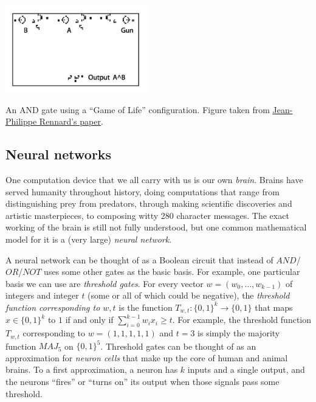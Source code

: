 \begin{marginfigure}
\centering
\includegraphics[width=\linewidth, height=1.5in, keepaspectratio]{../figure/game_of_life_and.png}
\caption{An AND gate using a ``Game of Life'' configuration. Figure
taken from
\href{http://www.rennard.org/alife/CollisionBasedRennard.pdf}{Jean-Philippe
Rennard's paper}.}
\label{gameoflifefig}
\end{marginfigure}

\subsection{Neural networks}\label{Neural-networks}

One computation device that we all carry with us is our own
\emph{brain}. Brains have served humanity throughout history, doing
computations that range from distinguishing prey from predators, through
making scientific discoveries and artistic masterpieces, to composing
witty 280 character messages. The exact working of the brain is still
not fully understood, but one common mathematical model for it is a
(very large) \emph{neural network}.

A neural network can be thought of as a Boolean circuit that instead of
\(\ensuremath{\mathit{AND}}\)/\(\ensuremath{\mathit{OR}}\)/\(\ensuremath{\mathit{NOT}}\)
uses some other gates as the basic basis. For example, one particular
basis we can use are \emph{threshold gates}. For every vector
\(w= (w_0,\ldots,w_{k-1})\) of integers and integer \(t\) (some or all
of which could be negative), the \emph{threshold function corresponding
to \(w,t\)} is the function \(T_{w,t}:\{0,1\}^k \rightarrow \{0,1\}\)
that maps \(x\in \{0,1\}^k\) to \(1\) if and only if
\(\sum_{i=0}^{k-1} w_i x_i \geq t\). For example, the threshold function
\(T_{w,t}\) corresponding to \(w=(1,1,1,1,1)\) and \(t=3\) is simply the
majority function \(\ensuremath{\mathit{MAJ}}_5\) on \(\{0,1\}^5\).
Threshold gates can be thought of as an approximation for \emph{neuron
cells} that make up the core of human and animal brains. To a first
approximation, a neuron has \(k\) inputs and a single output, and the
neurons ``fires'' or ``turns on'' its output when those signals pass
some threshold.

